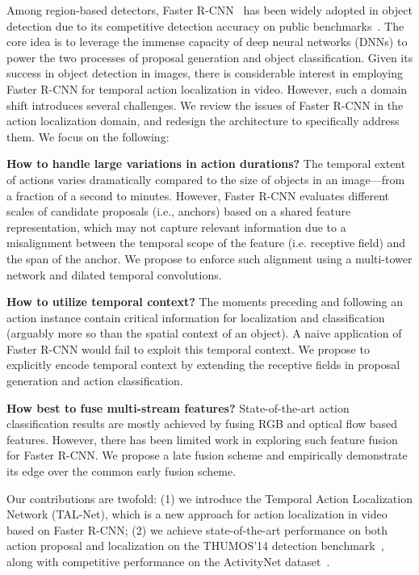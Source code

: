 \documentclass[10pt,twocolumn,letterpaper]{article}
\begin{document}
Among region-based detectors, Faster R-CNN~\cite{ren:nips2015} has been widely
adopted in object detection due to its competitive detection accuracy on public
benchmarks~\cite{lin:eccv2014,everingham:ijcv2015}. The core idea is to
leverage the immense capacity of deep neural networks (DNNs) to power the two
processes of proposal generation and object classification. Given its success
in object detection in images, there is considerable interest in employing
Faster R-CNN for temporal action localization in video. However, such a domain
shift introduces several challenges.
We review the issues of Faster R-CNN in the action localization domain, and
redesign the architecture to specifically address them. We focus on the
following:
\begin{compactenum}
 \vspace{0.45mm}
 \item \textbf{How to handle large variations in action durations?} The
temporal extent of actions varies dramatically compared to the size of objects
in an image---from a fraction of a second to minutes. However, Faster R-CNN
evaluates different scales of candidate proposals (i.e., anchors) based on a
shared feature representation, which may not capture relevant information due
to a misalignment between the temporal scope of the feature (i.e. receptive
field) and the span of the anchor. We propose to enforce such alignment using a
multi-tower network and dilated temporal convolutions.
 \vspace{0.45mm}
 \item \textbf{How to utilize temporal context?} The moments preceding and
following an action instance contain critical information for localization and
classification (arguably more so than the spatial context of an object). A
naive application of Faster R-CNN would fail to exploit this temporal context.
We propose to explicitly encode temporal context by extending the receptive
fields in proposal generation and action classification.
 \vspace{0.45mm}
 \item \textbf{How best to fuse multi-stream features?} State-of-the-art action
classification results are mostly achieved by fusing RGB and optical flow based
features. However, there has been limited work in exploring such feature fusion
for Faster R-CNN. We propose a late fusion scheme and empirically demonstrate
its edge over the common early fusion scheme.
\end{compactenum}
\vspace{0.45mm}
Our contributions are twofold: (1) we introduce the Temporal Action
Localization Network (TAL-Net), which is a new approach for action localization
in video based on Faster R-CNN; (2) we achieve state-of-the-art performance on
both action proposal and localization on the THUMOS'14 detection
benchmark~\cite{THUMOS14}, along with competitive performance on the
ActivityNet dataset~\cite{caba_heilbron:cvpr2015}.
\end{document}

